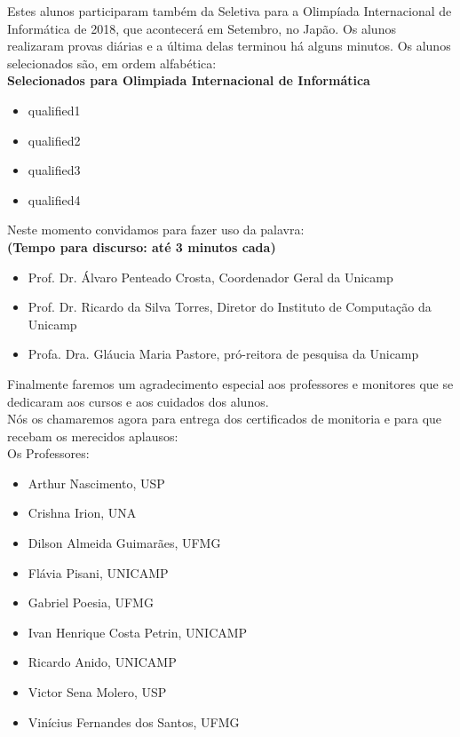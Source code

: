 \documentclass{article}
\begin{document}
Estes alunos participaram também da Seletiva para a Olimpíada Internacional de Informática de 2018, que acontecerá em Setembro, no Japão. Os alunos realizaram provas diárias e a última delas terminou há alguns minutos. Os alunos selecionados são, em ordem alfabética:\\
\color{blue}\textbf{Selecionados para Olimpiada Internacional de Informática}\color{black}

\begin{itemize}
\item qualified1
\item qualified2
\item qualified3
\item qualified4
\end{itemize}
\bigskip

Neste momento convidamos para fazer uso da palavra:\\
\color{red}\textbf{(Tempo para discurso: até 3 minutos cada)}\color{black}\
\begin{itemize}
\item Prof. Dr. Álvaro Penteado Crosta, Coordenador Geral da Unicamp
\item Prof. Dr. Ricardo da Silva Torres, Diretor do Instituto de Computação da Unicamp
\item Profa. Dra. Gláucia Maria Pastore, pró-reitora de pesquisa da Unicamp
\end{itemize}
\bigskip

Finalmente faremos um agradecimento especial aos professores e monitores que se dedicaram aos cursos e aos cuidados dos alunos.\\
Nós os chamaremos agora para entrega dos certificados de monitoria e para que recebam os merecidos aplausos:\\

Os Professores:

\begin{itemize}
\item Arthur Nascimento, USP
\item Crishna Irion, UNA
\item Dilson Almeida Guimarães, UFMG
\item Flávia Pisani, UNICAMP
\item Gabriel Poesia, UFMG
\item Ivan Henrique Costa Petrin, UNICAMP
\item Ricardo Anido, UNICAMP
\item Victor Sena Molero, USP
\item Vinícius Fernandes dos Santos, UFMG
\end{itemize}
\end{document}
